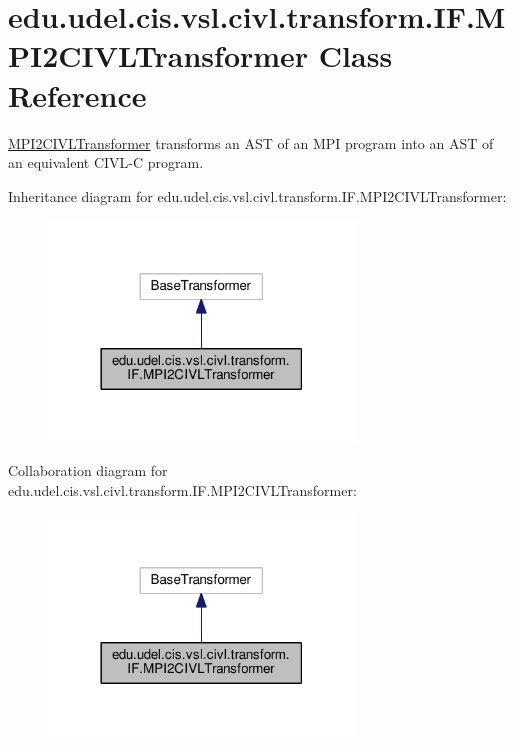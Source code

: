 \hypertarget{classedu_1_1udel_1_1cis_1_1vsl_1_1civl_1_1transform_1_1IF_1_1MPI2CIVLTransformer}{}\section{edu.\+udel.\+cis.\+vsl.\+civl.\+transform.\+I\+F.\+M\+P\+I2\+C\+I\+V\+L\+Transformer Class Reference}
\label{classedu_1_1udel_1_1cis_1_1vsl_1_1civl_1_1transform_1_1IF_1_1MPI2CIVLTransformer}


\hyperlink{classedu_1_1udel_1_1cis_1_1vsl_1_1civl_1_1transform_1_1IF_1_1MPI2CIVLTransformer}{M\+P\+I2\+C\+I\+V\+L\+Transformer} transforms an A\+S\+T of an M\+P\+I program into an A\+S\+T of an equivalent C\+I\+V\+L-\/\+C program.  




Inheritance diagram for edu.\+udel.\+cis.\+vsl.\+civl.\+transform.\+I\+F.\+M\+P\+I2\+C\+I\+V\+L\+Transformer\+:
\nopagebreak
\begin{figure}[H]
\begin{center}
\leavevmode
\includegraphics[width=230pt]{classedu_1_1udel_1_1cis_1_1vsl_1_1civl_1_1transform_1_1IF_1_1MPI2CIVLTransformer__inherit__graph}
\end{center}
\end{figure}


Collaboration diagram for edu.\+udel.\+cis.\+vsl.\+civl.\+transform.\+I\+F.\+M\+P\+I2\+C\+I\+V\+L\+Transformer\+:
\nopagebreak
\begin{figure}[H]
\begin{center}
\leavevmode
\includegraphics[width=230pt]{classedu_1_1udel_1_1cis_1_1vsl_1_1civl_1_1transform_1_1IF_1_1MPI2CIVLTransformer__coll__graph}
\end{center}
\end{figure}
